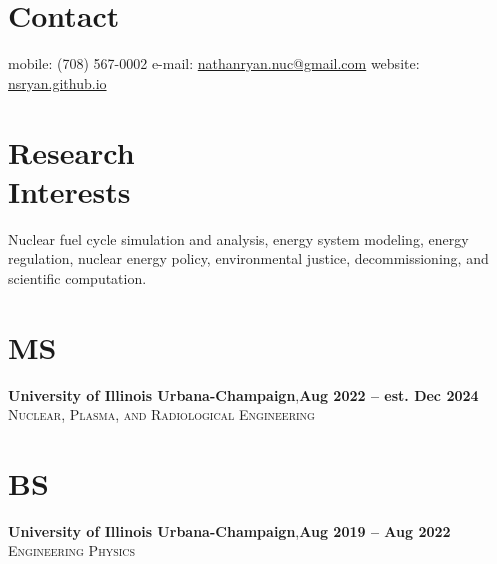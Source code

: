 \documentclass[margin,line]{resume}
\begin{document}
\begin{resume}

%


    \section{\mysidestyle Contact}
    mobile: (708) 567-0002 \hfill e-mail: \href{mailto:nathanryan.nuc@gmail.com}{nathanryan.nuc@gmail.com} \hfill website: \href{https://nsryan.github.io}{nsryan.github.io} \vspace{0mm}\\\vspace{1mm}%

    \vspace{-6mm}
    \section{\mysidestyle Research\\Interests}
                Nuclear fuel cycle simulation and analysis,
                energy system modeling, energy regulation, nuclear energy policy, environmental justice, decommissioning, and
                scientific computation.
    \section{\mysidestyle MS}
    \textbf{University of Illinois Urbana-Champaign},\hfill\textbf{Aug 2022 -- est. Dec 2024}\\
    \textsc{Nuclear, Plasma, and Radiological Engineering}\\
    \vspace{-5.5mm}
    \section{\mysidestyle BS}
    \textbf{University of Illinois Urbana-Champaign},\hfill\textbf{Aug 2019 -- Aug 2022}\\
    \textsc{Engineering Physics}\vspace{-3mm}\\\vspace{-1mm}


\end{resume}
\end{document}
